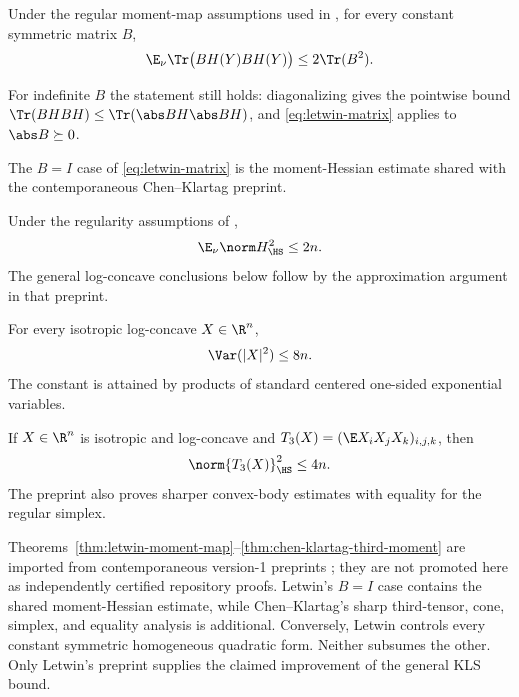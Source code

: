 \documentclass[../../main.tex]{subfiles}
\begin{document}
\begin{theorem}
\label{thm:letwin-moment-map}
Under the regular moment-map assumptions used in \cite{Letwin2026QuadraticKLS}, for every
constant symmetric matrix $B$,
\begin{equation}
  \E_\nu\Tr\bigl(BH(Y)BH(Y)\bigr)\le2\Tr(B^2).
  \label{eq:letwin-matrix}
\end{equation}
\end{theorem}

For indefinite $B$ the statement still holds: diagonalizing gives the pointwise bound
$\Tr(BHBH)\le\Tr(\abs BH\abs BH)$, and \eqref{eq:letwin-matrix} applies to $\abs B\succeq0$.

The $B=I$ case of \eqref{eq:letwin-matrix} is the moment-Hessian estimate shared with the
contemporaneous Chen--Klartag preprint.

\begin{theorem}
\label{thm:chen-klartag-moment-hessian}
Under the regularity assumptions of \cite{ChenKlartag2026SharpThinShell},
\[
  \E_\nu\norm H_{\HS}^2\le2n.
\]
The general log-concave conclusions below follow by the approximation argument in that preprint.
\end{theorem}

\begin{theorem}
\label{thm:chen-klartag-thin-shell}
For every isotropic log-concave $X\in\R^n$,
\[
  \Var(|X|^2)\le8n.
\]
The constant is attained by products of standard centered one-sided exponential variables.
\end{theorem}

\begin{theorem}
\label{thm:chen-klartag-third-moment}
If $X\in\R^n$ is isotropic and log-concave and $T_3(X)=(\E X_iX_jX_k)_{i,j,k}$, then
\[
  \norm{T_3(X)}_{\HS}^2\le4n.
\]
The preprint also proves sharper convex-body estimates with equality for the regular simplex.
\end{theorem}

\begin{remark}
\label{rem:mm-two-preprints}
Theorems~\ref{thm:letwin-moment-map}--\ref{thm:chen-klartag-third-moment} are imported from
contemporaneous version-1 preprints
\cite{ChenKlartag2026SharpThinShell,Letwin2026QuadraticKLS}; they are not promoted here as
independently certified repository proofs. Letwin's $B=I$ case contains the shared moment-Hessian
estimate, while Chen--Klartag's sharp third-tensor, cone, simplex, and equality analysis is
additional. Conversely, Letwin controls every constant symmetric homogeneous quadratic form.
Neither subsumes the other. Only Letwin's preprint supplies the claimed improvement of the general
KLS bound.
\end{remark}
\end{document}
